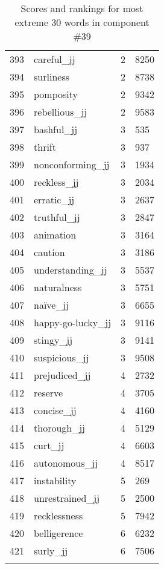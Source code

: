 \begin{longtable}[!htbp]{| rlr@{.}l |}
    393 & careful\_jj & 2 & 8250 \\
    394 & surliness & 2 & 8738 \\
    395 & pomposity & 2 & 9342 \\
    396 & rebellious\_jj & 2 & 9583 \\
    397 & bashful\_jj & 3 & 535 \\
    398 & thrift & 3 & 937 \\
    399 & nonconforming\_jj & 3 & 1934 \\
    400 & reckless\_jj & 3 & 2034 \\
    401 & erratic\_jj & 3 & 2637 \\
    402 & truthful\_jj & 3 & 2847 \\
    403 & animation & 3 & 3164 \\
    404 & caution & 3 & 3186 \\
    405 & understanding\_jj & 3 & 5537 \\
    406 & naturalness & 3 & 5751 \\
    407 & naïve\_jj & 3 & 6655 \\
    408 & happy-go-lucky\_jj & 3 & 9116 \\
    409 & stingy\_jj & 3 & 9141 \\
    410 & suspicious\_jj & 3 & 9508 \\
    411 & prejudiced\_jj & 4 & 2732 \\
    412 & reserve & 4 & 3705 \\
    413 & concise\_jj & 4 & 4160 \\
    414 & thorough\_jj & 4 & 5129 \\
    415 & curt\_jj & 4 & 6603 \\
    416 & autonomous\_jj & 4 & 8517 \\
    417 & instability & 5 & 269 \\
    418 & unrestrained\_jj & 5 & 2500 \\
    419 & recklessness & 5 & 7942 \\
    420 & belligerence & 6 & 6232 \\
    421 & surly\_jj & 6 & 7506 \\
    \hline
    \caption{Scores and rankings for most extreme 30 words in component \#39} \\
\end{longtable}

